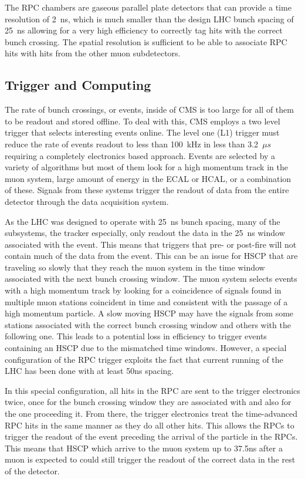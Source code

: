 The RPC chambers are gaseous parallel plate detectors that can provide a time resolution of 2~ns, which is much smaller than the design LHC bunch spacing of 25~ns allowing for
a very high efficiency to correctly tag hits with the correct bunch crossing. The spatial resolution is sufficient to be able to associate RPC hits with hits
from the other muon subdetectors.

\subsection{Trigger and Computing \label{sec:computing}}
The rate of bunch crossings, or events, inside of CMS is too large for all of them to be readout and stored offline. To deal with this, CMS employs a two level trigger
that selects interesting events online. 
The level one (L1) trigger must reduce the rate of events readout to less than 100~kHz in less than 3.2~$\mu s$
requiring a completely electronics based approach. 
Events are selected by a variety of algorithms but most of them look for a high momentum track in the muon
system, large amount of energy in the ECAL or HCAL, or a combination of these. Signals from these systems trigger the readout of data from the entire detector through
the data acquisition system. 

As the LHC was designed to operate with 25~ns bunch spacing, many of the subsystems, the tracker especially, only readout
the data in the 25~ns window associated with the event. This means that triggers that pre- or post-fire will not contain much of the data from the event.
This can be an issue for HSCP that are traveling so slowly that they reach the muon system in the time window associated with the next bunch crossing window.
The muon system selects events with a high momentum track by looking for a coincidence of signals found in multiple muon stations coincident in time and consistent
with the passage of a high momentum particle.
A slow moving HSCP may have the signals from some stations associated with the correct bunch crossing window and others with the following one.
This leads to a potential loss in efficiency to trigger events containing an HSCP due to the mismatched time windows.
However, a special configuration of the RPC trigger exploits the fact that current running of the LHC has been done with at least 50ns spacing.

In this special configuration, all hits in the RPC are sent to the trigger electronics twice,
once for the bunch crossing window they are associated with and also for the one proceeding it.
From there, the trigger electronics treat the time-advanced RPC hits in the same manner as they do all other hits. 
This allows the RPCs to trigger the readout of the event preceding the arrival of the particle in the RPCs.
This means that HSCP which arrive to the muon system up to 37.5ns after
a muon is expected to could still trigger the readout of the correct data in the rest of the detector.

